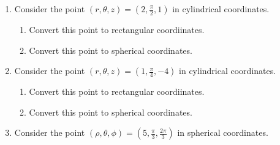 \documentclass[12pt]{article}
\newif\ifans
\begin{document}
\begin{enumerate}

\item Consider the point $(r,\theta,z)=\left(2, \frac{\pi}{2}, 1\right)$ in cylindrical coordinates.

\begin{enumerate}

\item Convert this point to rectangular coordiinates.

\ifans\fbox{{$(x,y,z)=(0,2,1)$}} \fi

\item Convert this point to spherical coordinates.

\ifans{\fbox{{$(\rho, \theta, \phi)=\left(\sqrt{5}, \frac{\pi}{2}, \cos^{-1}\frac{1}{\sqrt{5}}\right)$}} \fi

\end{enumerate}

\item Consider the point $(r,\theta,z)=\left(1, \frac{\pi}{4}, -4\right)$ in cylindrical coordinates.

\begin{enumerate}

\item Convert this point to rectangular coordiinates.

\ifans{\fbox{{$(x,y,z)=\left(\frac{\sqrt{2}}{2},\frac{\sqrt{2}}{2},-4\right)$}} \fi

\item Convert this point to spherical coordinates.

\ifans{\fbox{{$(\rho, \theta, \phi)=\left(\sqrt{17}, \frac{\pi}{4}, \cos^{-1}\left(-\frac{4}{\sqrt{17}}\right)\right)$}} \fi

\end{enumerate}

\item Consider the point $(\rho,\theta,\phi)=\left(5, \frac{\pi}{3}, \frac{2\pi}{3}\right)$ in spherical coordinates.

\end{enumerate}
\end{document}
